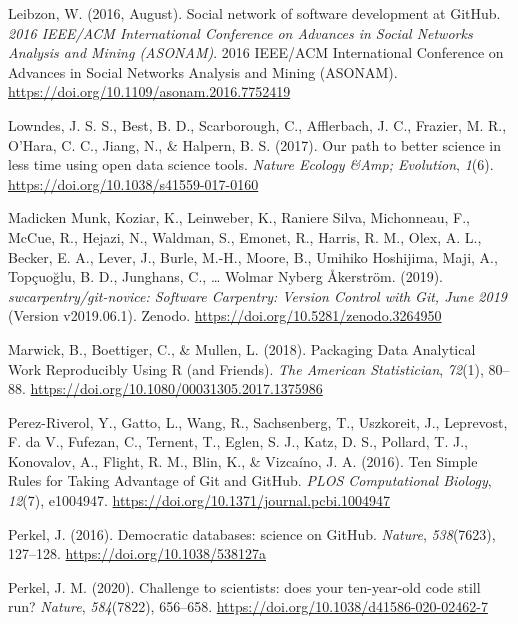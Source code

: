 \begin{CSLReferences}{1}{0}
\leavevmode{}%
Leibzon, W. (2016, August). Social network of software development at GitHub. \emph{2016 IEEE/ACM International Conference on Advances in Social Networks Analysis and Mining (ASONAM)}. 2016 IEEE/ACM International Conference on Advances in Social Networks Analysis and Mining (ASONAM). \url{https://doi.org/10.1109/asonam.2016.7752419}

\leavevmode{}%
Lowndes, J. S. S., Best, B. D., Scarborough, C., Afflerbach, J. C., Frazier, M. R., O'Hara, C. C., Jiang, N., \& Halpern, B. S. (2017). Our path to better science in less time using open data science tools. \emph{Nature Ecology \&Amp; Evolution}, \emph{1}(6). \url{https://doi.org/10.1038/s41559-017-0160}

\leavevmode{}%
Madicken Munk, Koziar, K., Leinweber, K., Raniere Silva, Michonneau, F., McCue, R., Hejazi, N., Waldman, S., Emonet, R., Harris, R. M., Olex, A. L., Becker, E. A., Lever, J., Burle, M.-H., Moore, B., Umihiko Hoshijima, Maji, A., Topçuoğlu, B. D., Junghans, C., \ldots{} Wolmar Nyberg Åkerström. (2019). \emph{swcarpentry/git-novice: Software Carpentry: Version Control with Git, June 2019} (Version v2019.06.1). Zenodo. \url{https://doi.org/10.5281/zenodo.3264950}

\leavevmode{}%
Marwick, B., Boettiger, C., \& Mullen, L. (2018). Packaging Data Analytical Work Reproducibly Using R (and Friends). \emph{The American Statistician}, \emph{72}(1), 80--88. \url{https://doi.org/10.1080/00031305.2017.1375986}

\leavevmode{}%
Perez-Riverol, Y., Gatto, L., Wang, R., Sachsenberg, T., Uszkoreit, J., Leprevost, F. da V., Fufezan, C., Ternent, T., Eglen, S. J., Katz, D. S., Pollard, T. J., Konovalov, A., Flight, R. M., Blin, K., \& Vizcaíno, J. A. (2016). Ten Simple Rules for Taking Advantage of Git and GitHub. \emph{PLOS Computational Biology}, \emph{12}(7), e1004947. \url{https://doi.org/10.1371/journal.pcbi.1004947}

\leavevmode{}%
Perkel, J. (2016). Democratic databases: science on GitHub. \emph{Nature}, \emph{538}(7623), 127--128. \url{https://doi.org/10.1038/538127a}

\leavevmode{}%
Perkel, J. M. (2020). Challenge to scientists: does your ten-year-old code still run? \emph{Nature}, \emph{584}(7822), 656--658. \url{https://doi.org/10.1038/d41586-020-02462-7}


\end{CSLReferences}

